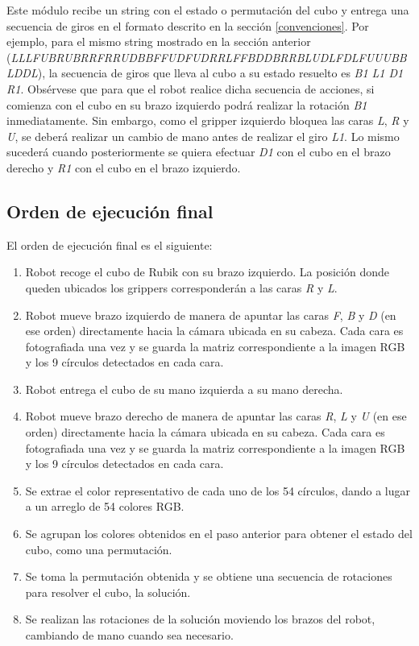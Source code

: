 Este módulo recibe un string con el estado o permutación del cubo y entrega una secuencia de giros en el formato descrito en la sección \ref{convenciones}. Por ejemplo, para el mismo string mostrado en la sección anterior (\textit{LLLFUBRUBRRFRRUDBBFFUDFUDRRLFFBDDBRRBLUDLFDLFUUUBBLDDL}), la secuencia de giros que lleva al cubo a su estado resuelto es \textit{B1 L1 D1 R1}. Obsérvese que para que el robot realice dicha secuencia de acciones, si comienza con el cubo en su brazo izquierdo podrá realizar la rotación \textit{B1} inmediatamente. Sin embargo, como el gripper izquierdo bloquea las caras \textit{L}, \textit{R} y \textit{U}, se deberá realizar un cambio de mano antes de realizar el giro \textit{L1}. Lo mismo sucederá cuando posteriormente se quiera efectuar \textit{D1} con el cubo en el brazo derecho y \textit{R1} con el cubo en el brazo izquierdo.


\subsection{Orden de ejecución final}
El orden de ejecución final es el siguiente:
\begin{enumerate}
	\item Robot recoge el cubo de Rubik con su brazo izquierdo. La posición donde queden ubicados los grippers corresponderán a las caras \textit{R} y \textit{L}.
	\item Robot mueve brazo izquierdo de manera de apuntar las caras \textit{F}, \textit{B} y \textit{D} (en ese orden) directamente hacia la cámara ubicada en su cabeza. Cada cara es fotografiada una vez y se guarda la matriz correspondiente a la imagen RGB y los 9 círculos detectados en cada cara.
	\item Robot entrega el cubo de su mano izquierda a su mano derecha.
	\item Robot mueve brazo derecho de manera de apuntar las caras \textit{R}, \textit{L} y \textit{U} (en ese orden) directamente hacia la cámara ubicada en su cabeza. Cada cara es fotografiada una vez y se guarda la matriz correspondiente a la imagen RGB y los 9 círculos detectados en cada cara.
	\item Se extrae el color representativo de cada uno de los 54 círculos, dando a lugar a un arreglo de 54 colores RGB.
	\item Se agrupan los colores obtenidos en el paso anterior para obtener el estado del cubo, como una permutación.
	\item Se toma la permutación obtenida y se obtiene una secuencia de rotaciones para resolver el cubo, la solución.
	\item Se realizan las rotaciones de la solución moviendo los brazos del robot, cambiando de mano cuando sea necesario.
\end{enumerate}
